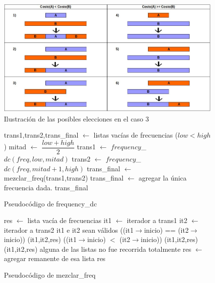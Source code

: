 \begin{figure}[htb]
  \begin{center}
      \includegraphics[scale=0.5]{imagenes/caso3.jpeg}
  \end{center}
  \caption{Ilustración de las posibles elecciones en el caso 3}\label{fig:caso3}
\end{figure}

\begin{figure}[!ht]
\begin{codebox}
\li trans1,trans2,trans_final $\leftarrow$ listas vacías de frecuencias
\li \If ($low < high$)
\li		\Then 
			mitad $\leftarrow$ $\dfrac{low + high}{2}$
\li			trans1 $\leftarrow$ $frequency$_$dc(freq,low,mitad)$
\li			trans2 $\leftarrow$ $frequency$_$dc(freq,mitad+1,high)$
\li			trans_final $\leftarrow$ {\sc mezclar_freq}(trans1,trans2)
\li 		\Else
			trans_final $\leftarrow$ agregar la única frecuencia dada.
		\End
\li \Return trans_final 
 \end{codebox}
\caption{Pseudocódigo de frequency_dc}\label{code:freq_dc}
\end{figure}

\begin{figure}[!ht]
\begin{codebox}
\li res $\leftarrow$ lista vacía de frecuencias
\li it1 $\leftarrow$ iterador a trans1
\li it2 $\leftarrow$ iterador a trans2
\li \While it1 e it2 sean válidos
\li		\Do 
 		\If ((it1$\rightarrow$inicio) == (it2$\rightarrow$inicio))
\li 			{}(it1,it2,res)
\li 			\Else
				\If ((it1$\rightarrow$inicio) $<$ (it2$\rightarrow$inicio))
\li				{}(it1,it2,res)
 				\End
\li			\Else 
{}(it1,it2,res)
 			\End
 		\End
\li \If alguna de las listas no fue recorrida totalmente
\li 		\Then res $\leftarrow$ agregar remanente de esa lista
		\End
\li \Return res
\end{codebox}
\caption{Pseudocódigo de mezclar_freq} \label{code:mezclar}
\end{figure}

